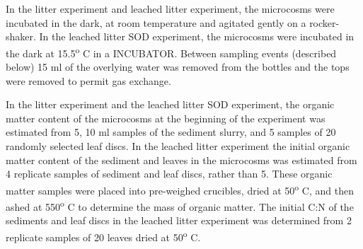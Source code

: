 In the litter experiment and leached litter experiment, the microcosms were incubated in the dark, at room temperature and agitated gently on a rocker-shaker. In the leached litter SOD experiment, the microcosms were incubated in the dark at 15.5\textsuperscript{o} C in a INCUBATOR.  Between sampling events (described below) 15 ml of the overlying water was removed from the bottles and the tops were removed to permit gas exchange.

In the litter experiment and the leached litter SOD experiment, the organic matter content of the microcosms at the beginning of the experiment was estimated from 5, 10 ml samples of the sediment slurry, and 5 samples of 20 randomly selected leaf discs. In the leached litter experiment the initial organic matter content of the sediment and leaves in the microcosms was estimated from 4 replicate samples of sediment and leaf discs, rather than 5. These organic matter samples were placed into pre-weighed crucibles, dried at 50\textsuperscript{o} C, and then ashed at 550\textsuperscript{o} C to determine the mass of organic matter. The initial C:N of the sediments and leaf discs in the leached litter experiment was determined from 2 replicate samples of 20 leaves dried at 50\textsuperscript{o} C.